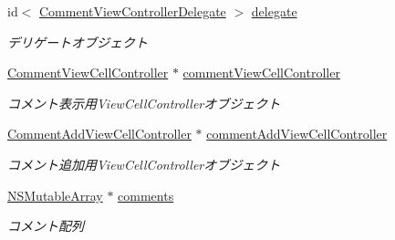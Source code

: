 \begin{DoxyCompactItemize}
\item 
\hypertarget{interface_comment_view_controller_a203cee689b101f2f89c363dc9d345e06}{
id$<$ \hyperlink{protocol_comment_view_controller_delegate-p}{CommentViewControllerDelegate} $>$ \hyperlink{interface_comment_view_controller_a203cee689b101f2f89c363dc9d345e06}{delegate}}
\label{interface_comment_view_controller_a203cee689b101f2f89c363dc9d345e06}

\begin{DoxyCompactList}\small\item\em デリゲートオブジェクト \end{DoxyCompactList}\item 
\hypertarget{interface_comment_view_controller_adbd94088fcfd1ea96ceaf2cade39ff67}{
\hyperlink{interface_comment_view_cell_controller}{CommentViewCellController} $\ast$ \hyperlink{interface_comment_view_controller_adbd94088fcfd1ea96ceaf2cade39ff67}{commentViewCellController}}
\label{interface_comment_view_controller_adbd94088fcfd1ea96ceaf2cade39ff67}

\begin{DoxyCompactList}\small\item\em コメント表示用ViewCellControllerオブジェクト \end{DoxyCompactList}\item 
\hypertarget{interface_comment_view_controller_af088ffae53763789bb354b31037426d5}{
\hyperlink{interface_comment_add_view_cell_controller}{CommentAddViewCellController} $\ast$ \hyperlink{interface_comment_view_controller_af088ffae53763789bb354b31037426d5}{commentAddViewCellController}}
\label{interface_comment_view_controller_af088ffae53763789bb354b31037426d5}

\begin{DoxyCompactList}\small\item\em コメント追加用ViewCellControllerオブジェクト \end{DoxyCompactList}\item 
\hypertarget{interface_comment_view_controller_a6a418f2ae7d6d0f0bfc13a7ae7426857}{
\hyperlink{class_n_s_mutable_array}{NSMutableArray} $\ast$ \hyperlink{interface_comment_view_controller_a6a418f2ae7d6d0f0bfc13a7ae7426857}{comments}}
\label{interface_comment_view_controller_a6a418f2ae7d6d0f0bfc13a7ae7426857}

\begin{DoxyCompactList}\small\item\em コメント配列 \end{DoxyCompactList}\end{DoxyCompactItemize}


